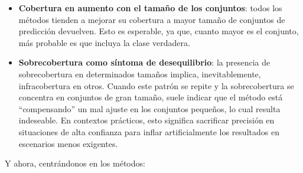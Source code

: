 \begin{itemize}
    
    \item \textbf{Cobertura en aumento con el tamaño de los conjuntos}: todos los métodos tienden a mejorar su cobertura a mayor tamaño de conjuntos de predicción devuelven. Esto es esperable, ya que, cuanto mayor es el conjunto, más probable es que incluya la clase verdadera.
    
    \item \textbf{Sobrecobertura como síntoma de desequilibrio}: la presencia de sobrecobertura en determinados tamaños implica, inevitablemente, infracobertura en otros. Cuando este patrón se repite y la sobrecobertura se concentra en conjuntos de gran tamaño, suele indicar que el método está “compensando” un mal ajuste en los conjuntos pequeños, lo cual resulta indeseable. En contextos prácticos, esto significa sacrificar precisión en situaciones de alta confianza para inflar artificialmente los resultados en escenarios menos exigentes.
    
\end{itemize}

Y ahora, centrándonos en los métodos:

